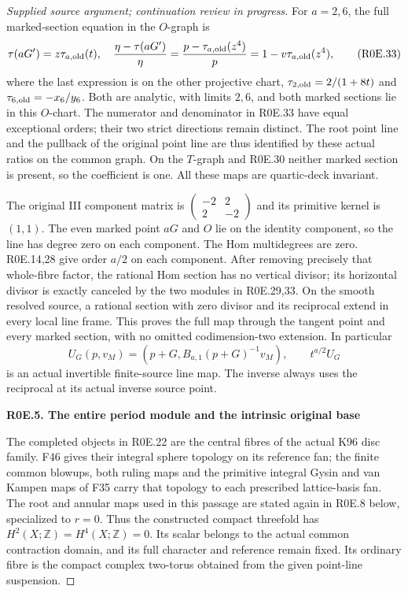 \begin{proof}[Supplied source argument; continuation review in progress]
For \(a=2,6\), the full marked-section equation in the \(O\)-graph is
\[
 \tau(aG')=z\tau_{a,\rm old}(t),\quad
 \frac{\eta-\tau(aG')}{\eta}
 =\frac{p-\tau_{a,\rm old}(z^4)}p
 =1-v\tau_{a,\rm old}(z^4),
 \tag{R0E.33}
\]
where the last expression is on the other projective chart,
\(\tau_{2,\rm old}=2/(1+8t)\) and
\(\tau_{6,\rm old}=-x_6/y_6\). Both are analytic, with limits
\(2,6\), and both marked sections lie in this \(O\)-chart.
The numerator and denominator in R0E.33 have equal exceptional
orders; their two strict directions remain distinct. The root point
line and the pullback of the original point line are thus identified
by these actual ratios on the common graph. On the \(T\)-graph and
R0E.30 neither marked section is present, so the coefficient is one.
All these maps are quartic-deck invariant.

The original III component matrix is
\(\left(\begin{smallmatrix}-2&2\\2&-2\end{smallmatrix}\right)\)
and its primitive kernel is \((1,1)\). The even marked point \(aG\)
and \(O\) lie on the identity component, so the line has degree zero
on each component. The Hom multidegrees are zero. R0E.14,28 give
order \(a/2\) on each component. After removing precisely that
whole-fibre factor, the rational Hom section has no vertical divisor;
its horizontal divisor is exactly canceled by the two modules in
R0E.29,33. On the smooth resolved source, a rational section with
zero divisor and its reciprocal extend in every local line frame.
This proves the full map through the tangent point and every marked
section, with no omitted codimension-two extension. In particular
\[
 U_G(p,v_M)=(p+G,B_{a,1}(p+G)^{-1}v_M),\qquad
                 t^{a/2}U_G
 \tag{R0E.34}
\]
is an actual invertible finite-source line map. The inverse always
uses the reciprocal at its actual inverse source point.

\par

\medskip\noindent\textbf{R0E.5. The entire period module and the intrinsic original base}

\par\nobreak

The completed objects in R0E.22 are the central fibres of the actual
K96 disc family. F46 gives their integral sphere topology on its
reference fan; the finite common blowups, both ruling maps and the
primitive integral Gysin and van Kampen maps of F35 carry that topology
to each prescribed lattice-basis fan. The root and annular maps used
in this passage are stated again in R0E.8 below, specialized to
\(r=0\). Thus the constructed compact threefold has
\(H^2(X;\mathbb Z)=H^4(X;\mathbb Z)=0\). Its scalar belongs to the
actual common contraction domain, and its full character and reference
remain fixed. Its ordinary fibre is the compact complex two-torus
obtained from the given point-line suspension.


\end{proof}
